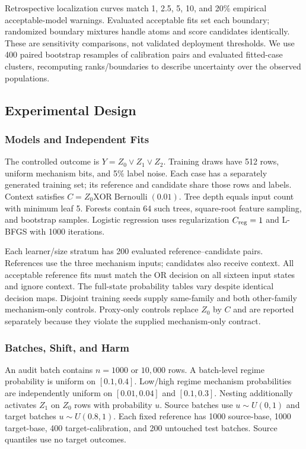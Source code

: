 \documentclass[conference]{IEEEtran}
\begin{document}
Retrospective localization curves match 1, 2.5, 5, 10, and 20\% empirical acceptable-model warnings. Evaluated acceptable fits set each boundary; randomized boundary mixtures handle atoms and score candidates identically. These are sensitivity comparisons, not validated deployment thresholds. We use 400 paired bootstrap resamples of calibration pairs and evaluated fitted-case clusters, recomputing ranks/boundaries to describe uncertainty over the observed populations.

\subsection{Experimental Design}
\subsubsection{Models and Independent Fits}
The controlled outcome is $Y=Z_0\lor Z_1\lor Z_2$. Training draws have 512 rows, uniform mechanism bits, and 5\% label noise. Each case has a separately generated training set; its reference and candidate share those rows and labels. Context satisfies $C=Z_0\mathbin{\mathrm{XOR}}\operatorname{Bernoulli}(0.01)$. Tree depth equals input count with minimum leaf 5. Forests contain 64 such trees, square-root feature sampling, and bootstrap samples. Logistic regression uses regularization $C_{\rm reg}=1$ and L-BFGS with 1000 iterations.

Each learner/size stratum has 200 evaluated reference--candidate pairs. References use the three mechanism inputs; candidates also receive context. All acceptable reference fits must match the OR decision on all sixteen input states and ignore context. The full-state probability tables vary despite identical decision maps. Disjoint training seeds supply same-family and both other-family mechanism-only controls. Proxy-only controls replace $Z_0$ by $C$ and are reported separately because they violate the supplied mechanism-only contract.

\subsubsection{Batches, Shift, and Harm}
An audit batch contains $n=1000$ or $10{,}000$ rows. A batch-level regime probability is uniform on $[0.1,0.4]$. Low/high regime mechanism probabilities are independently uniform on $[0.01,0.04]$ and $[0.1,0.3]$. Nesting additionally activates $Z_1$ on $Z_0$ rows with probability $u$. Source batches use $u\sim U(0,1)$ and target batches $u\sim U(0.8,1)$. Each fixed reference has 1000 source-base, 1000 target-base, 400 target-calibration, and 200 untouched test batches. Source quantiles use no target outcomes.
\end{document}
